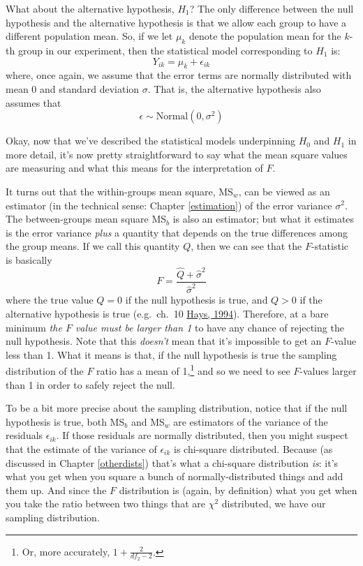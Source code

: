 \documentclass[
]{book}
\theoremstyle{definition}
\theoremstyle{definition}
\theoremstyle{definition}
\theoremstyle{definition}
\theoremstyle{remark}
\begin{document}
What about the alternative hypothesis, \(H_1\)? The only difference between the null hypothesis and the alternative hypothesis is that we allow each group to have a different population mean. So, if we let \(\mu_k\) denote the population mean for the \(k\)-th group in our experiment, then the statistical model corresponding to \(H_1\) is:
\[
Y_{ik} = \mu_k + \epsilon_{ik}
\]
where, once again, we assume that the error terms are normally distributed with mean 0 and standard deviation \(\sigma\). That is, the alternative hypothesis also assumes that
\[
\epsilon \sim \mbox{Normal}(0, \sigma^2)
\]

Okay, now that we've described the statistical models underpinning \(H_0\) and \(H_1\) in more detail, it's now pretty straightforward to say what the mean square values are measuring and what this means for the interpretation of \(F\).

It turns out that the within-groups mean square, MS\(_w\), can be viewed as an estimator (in the technical sense: Chapter \ref{estimation}) of the error variance \(\sigma^2\). The between-groups mean square MS\(_b\) is also an estimator; but what it estimates is the error variance \emph{plus} a quantity that depends on the true differences among the group means. If we call this quantity \(Q\), then we can see that the \(F\)-statistic is basically
\[
F = \frac{\hat{Q} + \hat\sigma^2}{\hat\sigma^2}
\]
where the true value \(Q=0\) if the null hypothesis is true, and \(Q > 0\) if the alternative hypothesis is true (e.g.~ch.~10 \protect\hyperlink{ref-Hays1994}{Hays, 1994}). Therefore, at a bare minimum \emph{the \(F\) value must be larger than 1} to have any chance of rejecting the null hypothesis. Note that this \emph{doesn't} mean that it's impossible to get an \(F\)-value less than 1. What it means is that, if the null hypothesis is true the sampling distribution of the \(F\) ratio has a mean of 1,\footnote{Or, more accurately, \(1 + \frac{2}{df_2 - 2}\).} and so we need to see \(F\)-values larger than 1 in order to safely reject the null.

To be a bit more precise about the sampling distribution, notice that if the null hypothesis is true, both MS\(_b\) and MS\(_w\) are estimators of the variance of the residuals \(\epsilon_{ik}\). If those residuals are normally distributed, then you might suspect that the estimate of the variance of \(\epsilon_{ik}\) is chi-square distributed. Because (as discussed in Chapter \ref{otherdists}) that's what a chi-square distribution \emph{is}: it's what you get when you square a bunch of normally-distributed things and add them up. And since the \(F\) distribution is (again, by definition) what you get when you take the ratio between two things that are \(\chi^2\) distributed, we have our sampling distribution.
\end{document}
